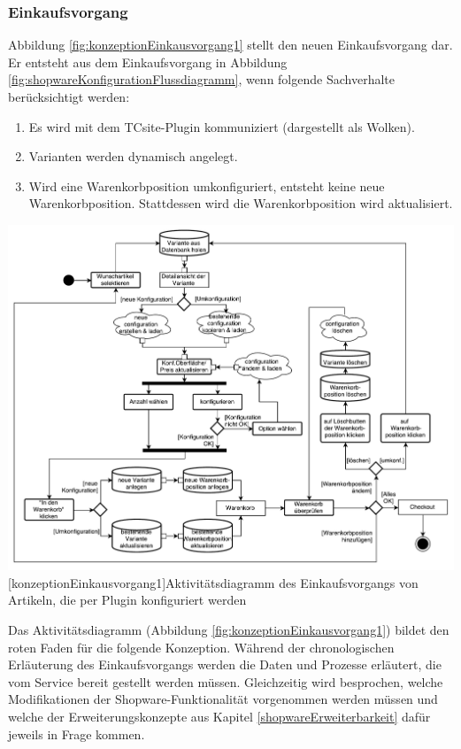 \documentclass[11pt, a4paper, titlepage, listof=totoc, bibliography=totoc, index=totoc, twoside, openright, headings=normal, draft]{scrreprt}
\begin{document}
\subsubsection{Einkaufsvorgang}
Abbildung \ref{fig:konzeptionEinkausvorgang1} stellt den neuen Einkaufsvorgang dar. Er entsteht aus dem Einkaufsvorgang in Abbildung \ref{fig:shopwareKonfigurationFlussdiagramm}, wenn folgende Sachverhalte berücksichtigt werden:
\begin{enumerate}
\item Es wird mit dem TCsite-Plugin kommuniziert (dargestellt als Wolken).
\item Varianten werden dynamisch angelegt.
\item Wird eine Warenkorbposition umkonfiguriert, entsteht keine neue Warenkorbposition. Stattdessen wird die Warenkorbposition wird aktualisiert.
\end{enumerate}

\vspace{1em}
\begin{minipage}{\linewidth}
	\centering
	\includegraphics[width=1\linewidth]{Abbildungen/konzeptionEinkausvorgang1.pdf}
	[konzeptionEinkausvorgang1]{Aktivitätsdiagramm des Einkaufsvorgangs von Artikeln, die per Plugin konfiguriert werden}
	\label{fig:konzeptionEinkausvorgang1}
\end{minipage}
\vspace{1em}

Das Aktivitätsdiagramm (Abbildung \ref{fig:konzeptionEinkausvorgang1}) bildet den \glqq roten Faden\grqq{} für die folgende Konzeption. Während der chronologischen Erläuterung des Einkaufsvorgangs werden die Daten und Prozesse erläutert, die vom Service bereit gestellt werden müssen. Gleichzeitig wird besprochen, welche Modifikationen der Shopware-Funktionalität vorgenommen werden müssen und welche der Erweiterungskonzepte aus Kapitel \ref{shopwareErweiterbarkeit} dafür jeweils in Frage kommen.
\end{document}
